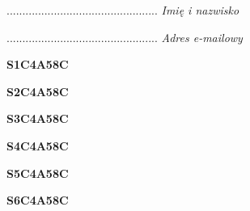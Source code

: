 \begin{turn}{90}\begin{minipage}{\linewidth} \vspace{20mm} ................................................  \textit{Imię i nazwisko}\end{minipage}\end{turn}

\begin{turn}{90}\begin{minipage}{\linewidth} \vspace{20mm} ................................................  \textit{Adres e-mailowy}\end{minipage}\end{turn}

\begin{turn}{90}\huge \begin{minipage}{\linewidth} \vspace{10mm}\textbf{S1C4A58C}\end{minipage}\end{turn}

\begin{turn}{90}\huge \begin{minipage}{\linewidth} \vspace{10mm}\textbf{S2C4A58C}\end{minipage}\end{turn}

\begin{turn}{90}\huge \begin{minipage}{\linewidth} \vspace{10mm}\textbf{S3C4A58C}\end{minipage}\end{turn}

\begin{turn}{90}\huge \begin{minipage}{\linewidth} \vspace{10mm}\textbf{S4C4A58C}\end{minipage}\end{turn}

\begin{turn}{90}\huge \begin{minipage}{\linewidth} \vspace{10mm}\textbf{S5C4A58C}\end{minipage}\end{turn}

\begin{turn}{90}\huge \begin{minipage}{\linewidth} \vspace{10mm}\textbf{S6C4A58C}\end{minipage}\end{turn}

